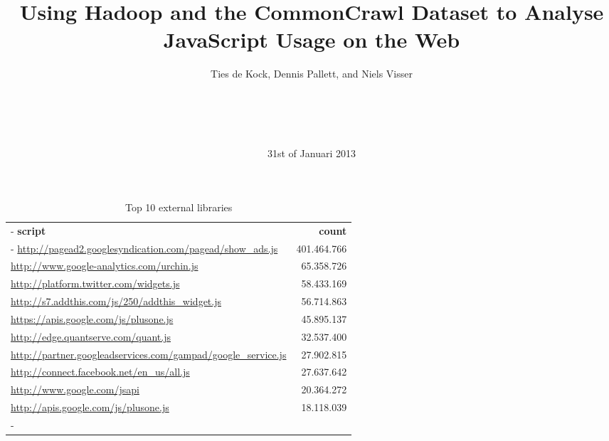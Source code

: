 \documentclass{sig-alternate}
\begin{document}

\title{Using Hadoop and the CommonCrawl Dataset to Analyse JavaScript Usage on the Web}


\author{
\alignauthor Ties de Kock, Dennis Pallett, and Niels Visser\\
	\\
	\\
	\\
	\\
}

\date{31st of Januari 2013}

\maketitle
\begin{abstract}

\end{abstract}




\begin{table*}[t]
	\begin{tabu} to 
		\tabucline-
		\rowfont{\normalfont\bfseries}
		\textbf{script} & \textbf{count} \\
		\tabucline-
		\url{http://pagead2.googlesyndication.com/pagead/show_ads.js}				&	401.464.766	 \\
		\url{http://www.google-analytics.com/urchin.js}   		&	65.358.726		 \\
		\url{http://platform.twitter.com/widgets.js}	&	58.433.169		 \\
		\url{http://s7.addthis.com/js/250/addthis_widget.js}   				&	56.714.863	 \\
		\url{https://apis.google.com/js/plusone.js} 	 			&	45.895.137	 \\
		\url{http://edge.quantserve.com/quant.js}	 			&	32.537.400	 \\
		\url{http://partner.googleadservices.com/gampad/google_service.js} 					&	27.902.815 		 \\
		\url{http://connect.facebook.net/en_us/all.js}			&	27.637.642		 \\
		\url{http://www.google.com/jsapi}				&	20.364.272		 \\
		\url{http://apis.google.com/js/plusone.js}				&	18.118.039		 \\
		\tabucline-
	\end{tabu}
	\caption{Top 10 external libraries\label{tab:top10_external}}
\end{table*}






\end{document}
